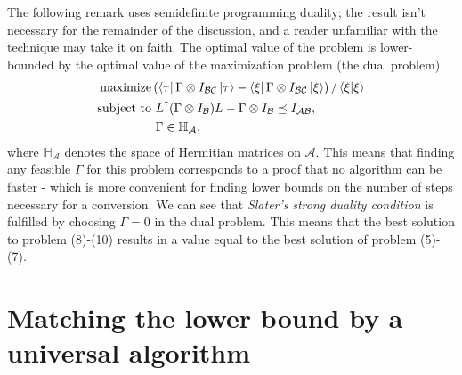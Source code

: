\documentclass{article}
\begin{document}
The following remark uses semidefinite programming duality; the result isn't necessary for the remainder of the discussion, and a reader unfamiliar with the technique may take it on faith. The optimal value of the problem is lower-bounded by the optimal value of the maximization problem (the dual problem)
\begin{align*}
\mathrm{maximize} & \left(\bra{\tau } \Gamma \otimes I_{\mathcal{BC}}\ket{\tau } -\bra{\xi } \Gamma \otimes I_{\mathcal{BC}}\ket{\xi }\right) /\bra{\xi }\ket{\xi }\\
\mathrm{subject\ to} & \ L^{\dagger }( \Gamma \otimes I_{\mathcal{B}}) L-\Gamma \otimes I_{\mathcal{B}} \preceq I_{\mathcal{AB}} ,\\
 & \ \Gamma \in \mathbb{H}_{\mathcal{A}} ,
\end{align*}
where $\displaystyle \mathbb{H}_{\mathcal{A}}$ denotes the space of Hermitian matrices on $\displaystyle \mathcal{A}$. This means that finding any feasible $\displaystyle \Gamma $ for this problem corresponds to a proof that no algorithm can be faster - which is more convenient for finding lower bounds on the number of steps necessary for a conversion. We can see that \textit{Slater's} \textit{strong duality condition }is fulfilled by choosing $\displaystyle \Gamma =0$ in the dual problem. This means that the best solution to problem (8)-(10) results in a value equal to the best solution of problem (5)-(7).
\section{Matching the lower bound by a universal algorithm}
\end{document}

